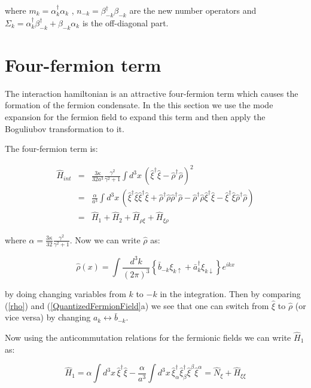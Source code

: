 \begin{doublespace}
where $m_k = \alpha^\dag_k\alpha_k$ , $n_{-k} = \beta^\dag_{-k}\beta_{-k}$ are the new number
operators and $\Sigma_k = \alpha^\dag_k\beta^\dag_{-k} + \beta_{-k}\alpha_k$ is the off-diagonal
part.

\section{Four-fermion term}

The interaction hamiltonian is an attractive four-fermion term which causes the formation of the
fermion condensate. In the this section we use the mode expansion for the fermion field to expand
this term and then apply the Boguliubov transformation to it.

The four-fermion term is:

\begin{eqnarray}\label{FourFermionTerm}
    \hat H_{int} &=& \frac{3\kappa}{32a^3}\frac{\gamma^2}{\gamma^2+1}
            \int d^3x\,\left(\hat\xi^\dag\hat\xi - \hat\rho^\dag\hat\rho\right)^2 \nonumber \\
    &=&  \frac{\alpha}{a^3} \int d^3x\, \left(\hat\xi^\dag\hat\xi\hat\xi^\dag\hat\xi +
                \hat\rho^\dag\hat\rho\hat\rho^\dag\hat\rho
                - \hat\rho^\dag\hat\rho\hat\xi^\dag\hat\xi - \hat\xi^\dag\hat\xi\hat\rho^\dag\hat\rho
                \right) \nonumber \\
    &=& \hat H_1 + \hat H_2 + \hat H_{\rho\xi} + \hat H_{\xi\rho}
\end{eqnarray}

where $\alpha = \frac{3\kappa}{32}\frac{\gamma^2}{\gamma^2+1}$. Now we can write $\hat\rho$ as:

\begin{equation}\label{rho}
    \hat\rho(x) = \int \frac{d^3k}{(2\pi)^3} \left\{\bar b_{-k} \xi_{k\uparrow}+\bar a^\dag_{k} \xi_{k\downarrow}\right\}e^{ikx}
\end{equation}

by doing changing variables from $k$ to $-k$ in the integration. Then by comparing (\ref{rho}) and
(\ref{QuantizedFermionField}a) we see that one can switch from $\hat\xi$ to $\hat\rho$ (or vice
versa) by changing $a_k \leftrightarrow \bar b_{-k}$.

Now using the anticommutation relations for the fermionic fields we can write $\hat H_1$ as:

\begin{equation}
    \hat H_1 = \alpha \int d^3x\, \hat\xi^\dag \hat\xi -
    \frac{\alpha}{a^3} \int d^3x\,
    \hat\xi^\dag_\alpha\hat\xi^\dag_\beta\hat\xi^\beta\hat\xi^\alpha
    = \hat N_\xi + \hat H_{\xi\xi}
\end{equation}


\end{doublespace}
